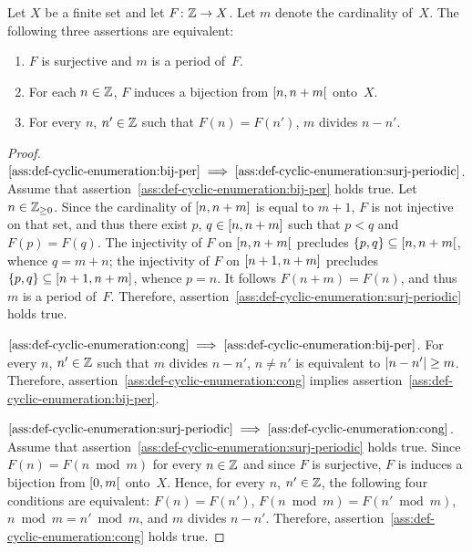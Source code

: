 \begin{theorem} \label{thm:def-cyclic-enumeration} 
  Let $X$ be a finite set and let $F \colon \mathbb{Z} \to X$.
  Let $m$ denote the cardinality of~$X$.
  The following three assertions are equivalent:
  \begin{enumerate}
  \item \label{ass:def-cyclic-enumeration:surj-periodic}
    $F$ is surjective and $m$ is a period of~$F$.
  \item \label{ass:def-cyclic-enumeration:bij-per}
    For each $n \in \mathbb{Z}$, $F$ induces a bijection from $\left[ n, n + m \right[$ onto~$X$.
  \item \label{ass:def-cyclic-enumeration:cong}
    For every $n$, $n' \in \mathbb{Z}$ such that $F(n) = F(n')$, $m$ divides $n - n'$.
  \end{enumerate} 
\end{theorem}


\begin{proof}
  $\ref{ass:def-cyclic-enumeration:bij-per} \implies \ref{ass:def-cyclic-enumeration:surj-periodic}$.
  Assume that assertion~\ref{ass:def-cyclic-enumeration:bij-per} holds true.
  Let $n \in \mathbb{Z}_{\ge 0}$.
  Since the cardinality of $\left[ n, n + m \right]$ is equal to $m + 1$,
  $F$ is not injective on that set,
  and thus there exist $p$, $q \in \left[ n, n + m \right]$ such that $p < q$ and $F(p) = F(q)$.
  The injectivity of $F$ on $\left[ n, n + m \right[$ precludes $\{ p, q \} \subseteq \left[ n, n + m \right[$,
  whence $q = m + n$;
  the injectivity of $F$ on $\left[ n + 1, n + m \right]$ precludes $\{ p, q \} \subseteq \left[ n + 1, n + m \right]$,
  whence $p = n$.
  It follows $F(n + m) = F(n)$, and thus $m$ is a period of~$F$.
  Therefore, assertion~\ref{ass:def-cyclic-enumeration:surj-periodic} holds true.
  
  
  $\ref{ass:def-cyclic-enumeration:cong} \implies \ref{ass:def-cyclic-enumeration:bij-per}$.
  For every $n$, $n' \in \mathbb{Z}$ such that $m$ divides $n - n'$, $n \ne n'$ is equivalent to $\left| n - n' \right| \ge m$.
  Therefore, assertion~\ref{ass:def-cyclic-enumeration:cong} implies assertion~\ref{ass:def-cyclic-enumeration:bij-per}.

  $\ref{ass:def-cyclic-enumeration:surj-periodic} \implies \ref{ass:def-cyclic-enumeration:cong}$.
  Assume that assertion~\ref{ass:def-cyclic-enumeration:surj-periodic} holds true.
  Since $F(n) = F(n \bmod m)$ for every $n \in \mathbb{Z}$ and since $F$ is surjective,
  $F$ is induces a bijection from $\left[ 0, m \right[$ onto~$X$.
  Hence, for every $n$, $n' \in \mathbb{Z}$, the following four conditions are equivalent:
  $F(n) = F(n')$,
  $F(n \bmod m) = F(n' \bmod m)$,
  $n \bmod m = n' \bmod m$, and
  $m$ divides $n - n'$.
  Therefore, assertion~\ref{ass:def-cyclic-enumeration:cong} holds true.
\end{proof}

